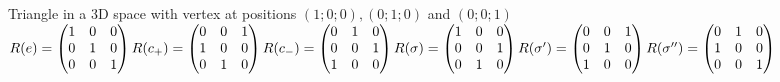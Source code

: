Triangle in a 3D space with vertex at positions $(1;0;0), (0;1;0)$ and $(0;0;1)$ \\
$R(e) = \begin{pmatrix} 1 & 0 & 0 \\ 0 & 1 & 0 \\ 0 & 0 & 1\end{pmatrix}
    R(c_+) = \begin{pmatrix} 0 & 0 & 1 \\ 1 & 0 & 0 \\ 0 & 1 & 0\end{pmatrix}
    R(c_-) = \begin{pmatrix} 0 & 1 & 0 \\ 0 & 0 & 1 \\ 1 & 0 & 0\end{pmatrix} \\
    R(\sigma) = \begin{pmatrix} 1 & 0 & 0 \\ 0 & 0 & 1 \\ 0 & 1 & 0\end{pmatrix}
    R(\sigma') = \begin{pmatrix} 0 & 0 & 1 \\ 0 & 1 & 0 \\ 1 & 0 & 0\end{pmatrix}
    R(\sigma'') = \begin{pmatrix} 0 & 1 & 0 \\ 1 & 0 & 0 \\ 0 & 0 & 1\end{pmatrix}
$

